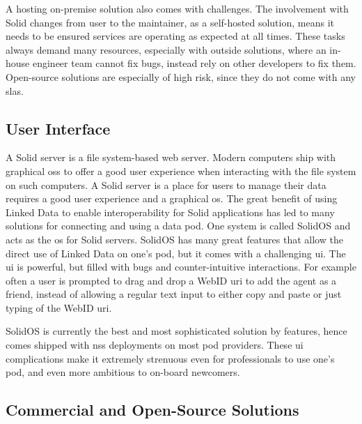 A hosting on-premise solution also comes with challenges. The involvement with Solid changes from user to the maintainer, as a self-hosted solution, means it needs to be ensured services are operating as expected at all times. These tasks always demand many resources, especially with outside solutions, where an in-house engineer team cannot fix bugs, instead rely on other developers to fix them. Open-source solutions are especially of high risk, since they do not come with any \glspl{sla}.

\subsection{User Interface}

A Solid server is a file system-based web server. Modern computers ship with graphical \glspl{os} to offer a good user experience when interacting with the file system on such computers. A Solid server is a place for users to manage their data requires a good user experience and a graphical \gls{os}. The great benefit of using Linked Data to enable interoperability for Solid applications has led to many solutions for connecting and using a data pod. One system is called SolidOS \cite{solidos} and acts as the \gls{os} for Solid servers. SolidOS has many great features that allow the direct use of Linked Data on one's pod, but it comes with a challenging \gls{ui}. The \gls{ui} is powerful, but filled with bugs and counter-intuitive interactions. For example often a user is prompted to drag and drop a WebID \gls{uri} to add the agent as a friend, instead of allowing a regular text input to either copy and paste or just typing of the WebID \gls{uri}.

SolidOS is currently the best and most sophisticated solution by features, hence comes shipped with \gls{nss} deployments on most pod providers. These \gls{ui} complications make it extremely strenuous even for professionals to use one's pod, and even more ambitious to on-board newcomers.

\subsection{Commercial and Open-Source Solutions}

